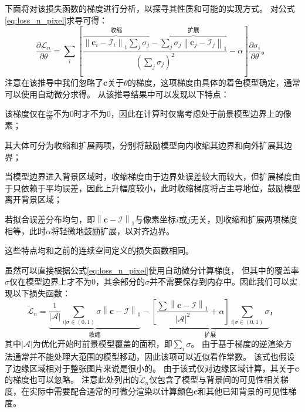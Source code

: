 下面将对该损失函数的梯度进行分析，以探寻其性质和可能的实现方式。
对公式\ref{eq:loss_n_pixel}求导可得：
\begin{equation}
\frac{\partial\mathcal{L}_n}{\partial\theta} =
\sum_{i}\left[
    \frac{
        \overbrace{\textstyle \left\| \mathbf{c}_i - \mathcal{I}_i \right\|_1 \sum_j\sigma_j}^\text{收缩} -
        \overbrace{\textstyle \sum_j \sigma_j \left\| \mathbf{c}_j - \mathcal{I}_j \right\|_1}^\text{扩展}
    }{\left(\sum_j\sigma_j\right)^2} - \alpha
\right]\frac{\partial\sigma_i}{\partial\theta}
\text{。}
\end{equation}
注意在该推导中我们忽略了$\mathbf{c}$关于$\theta$的梯度，这项梯度由具体的着色模型确定，通常可以使用自动微分求得。
从该推导结果中可以发现以下特点：
\begin{enumerate*}
    \item 该梯度仅在$\frac{\partial\sigma}{\partial\theta}$不为0时才不为0，因此在计算时仅需考虑处于前景模型边界上的像素；
    \item 其大体可分为收缩和扩展两项，分别将鼓励模型向内收缩其边界和向外扩展其边界；
    \item 当模型边界进入背景区域时，收缩梯度由于边界处误差较大而较大，但扩展梯度由于只依赖于平均误差，因此上升幅度较小，此时收缩梯度将占主导地位，鼓励模型离开背景区域；
    \item 若拟合误差分布均匀，即$\left\|\mathbf{c} - \mathcal{I}\right\|_1$与像素坐标$i$或$j$无关，则收缩和扩展两项梯度相等，此时$\alpha$将轻微地鼓励扩展，以对齐边界。
\end{enumerate*}
这些特点均和之前的连续空间定义的损失函数相同。

虽然可以直接根据公式\ref{eq:loss_n_pixel}使用自动微分计算梯度，
但其中的覆盖率$\sigma$仅在模型边界上才不为0，其余部分的$\sigma$并不需要保存到内存中。因此我们可以实现以下损失函数：
\begin{equation}
\tilde{\mathcal{L}}_n =
\underbrace{\frac{1}{|\mathcal{A}|}\sum_{i|\sigma\in(0,1)} \sigma\left\| \mathbf{c} - \mathcal{I} \right\|_1}_{\text{收缩}} -
\underbrace{\left[\frac{\sum\left\| \mathbf{c} - \mathcal{I} \right\|_1}{|\mathcal{A}|^2}+\alpha\right]\sum_{i|\sigma\in(0,1)} \sigma}_{\text{扩展}}
\text{，}
\label{eq:loss_n_tilde}
\end{equation}
其中$|\mathcal{A}|$为优化开始时前景模型覆盖的面积，即$\sum_{i} \sigma$。
由于基于梯度的逆渲染方法通常并不能处理大范围的模型移动，因此该项可以近似看作常数。
该式也假设了边缘区域相对于整张图片来说是很小的。
由于该式仅对边缘区域计算，其关于$\mathbf{c}$的梯度也可以忽略。
注意此处列出的$\tilde{\mathcal{L}}_n$仅包含了模型与背景间的可见性相关梯度，在实际中需要配合通常的可微分渲染以计算颜色$\mathbf{c}$和其他已知背景的可见性梯度。

